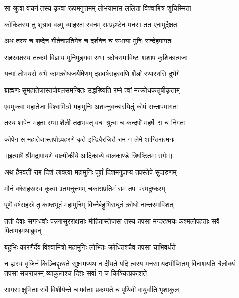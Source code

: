 \twolineshloka
{सा श्रुत्वा वचनं तस्य कृत्वा रूपमनुत्तमम्}
{लोभयामास ललिता विश्वामित्रं शुचिस्मिता} %

\twolineshloka
{कोकिलस्य तु शुश्राव वल्गु व्याहरतः स्वनम्}
{सम्प्रहृष्टेन मनसा तत एनामुदैक्षत} %

\twolineshloka
{अथ तस्य च शब्देन गीतेनाप्रतिमेन च}
{दर्शनेन च रम्भाया मुनिः सन्देहमागतः} %

\twolineshloka
{सहस्राक्षस्य तत्कर्म विज्ञाय मुनिपुङ्गवः}
{रम्भां क्रोधसमाविष्टः शशाप कुशिकात्मजः} %

\twolineshloka
{यन्मां लोभयसे रम्भे कामक्रोधजयैषिणम्}
{दशवर्षसहस्राणि शैली स्थास्यसि दुर्भगे} %

\twolineshloka
{ब्राह्मणः सुमहातेजास्तपोबलसमन्वितः}
{उद्धरिष्यति रम्भे त्वां मत्क्रोधकलुषीकृताम्} %

\twolineshloka
{एवमुक्त्वा महातेजा विश्वामित्रो महामुनिः}
{अशक्नुवन्धारयितुं कोपं सन्तापमागतः} %

\twolineshloka
{तस्य शापेन महता रम्भा शैली तदाभवत्}
{वचः श्रुत्वा च कन्दर्पो महर्षेः स च निर्गतः} %

\twolineshloka
{कोपेन स महातेजास्तपोऽपहरणे कृते}
{इन्द्रियैरजितै राम न लेभे शान्तिमात्मनः} %


{॥इत्यार्षे श्रीमद्रामायणे वाल्मीकीये आदिकाव्ये बालकाण्डे त्रिषष्टितमः सर्गः॥}


\twolineshloka
{अथ हैमवतीं राम दिशं त्यक्त्वा महामुनिः}
{पूर्वां दिशमनुप्राप्य तपस्तेपे सुदारुणम्} %

\twolineshloka
{मौनं वर्षसहस्रस्य कृत्वा व्रतमनुत्तमम्}
{चकाराप्रतिमं राम तपः परमदुष्करम्} %

\twolineshloka
{पूर्णे वर्षसहस्रे तु काष्ठभूतं महामुनिम्}
{विघ्नैर्बहुभिराधूतं क्रोधो नान्तरमाविशत्} %

\threelineshloka
{ततो देवाः सगन्धर्वाः पन्नगासुरराक्षसाः}
{मोहितास्तेजसा तस्य तपसा मन्दरश्मयः}
{कश्मलोपहताः सर्वे पितामहमथाब्रुवन्} %

\twolineshloka
{बहुभिः कारणैर्देव विश्वामित्रो महामुनिः}
{लोभितः क्रोधितश्चैव तपसा चाभिवर्धते} %

\fourlineshloka
{न ह्यस्य वृजिनं किञ्चिद्दृश्यते सूक्ष्ममप्यथ}
{न दीयते यदि त्वस्य मनसा यदभीप्सितम्}
{विनाशयति त्रैलोक्यं तपसा सचराचरम्}
{व्याकुलाश्च दिशः सर्वा न च किञ्चित्प्रकाशते} %

\twolineshloka
{सागराः क्षुभिताः सर्वे विशीर्यन्ते च पर्वताः}
{प्रकम्पते च पृथिवी वायुर्वाति भृशाकुलः} %

